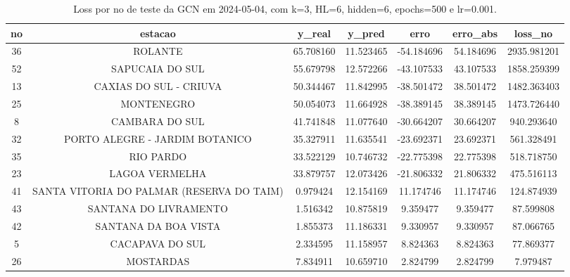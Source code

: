 \begin{table}[h]
\centering
\caption{Loss por no de teste da GCN em 2024-05-04, com k=3, HL=6, hidden=6, epochs=500 e lr=0.001.}
\label{tab:gcn_loss_k3_hl6_h6_e500_d20240504}
\begin{tabular}{ccccccc}
\toprule
no & estacao & y\_real & y\_pred & erro & erro\_abs & loss\_no \\
\midrule
36 & ROLANTE & 65.708160 & 11.523465 & -54.184696 & 54.184696 & 2935.981201 \\
52 & SAPUCAIA DO SUL & 55.679798 & 12.572266 & -43.107533 & 43.107533 & 1858.259399 \\
13 & CAXIAS DO SUL - CRIUVA & 50.344467 & 11.842995 & -38.501472 & 38.501472 & 1482.363403 \\
25 & MONTENEGRO & 50.054073 & 11.664928 & -38.389145 & 38.389145 & 1473.726440 \\
8 & CAMBARA DO SUL & 41.741848 & 11.077640 & -30.664207 & 30.664207 & 940.293640 \\
32 & PORTO ALEGRE - JARDIM BOTANICO & 35.327911 & 11.635541 & -23.692371 & 23.692371 & 561.328491 \\
35 & RIO PARDO & 33.522129 & 10.746732 & -22.775398 & 22.775398 & 518.718750 \\
23 & LAGOA VERMELHA & 33.879757 & 12.073426 & -21.806332 & 21.806332 & 475.516113 \\
41 & SANTA VITORIA DO PALMAR (RESERVA DO TAIM) & 0.979424 & 12.154169 & 11.174746 & 11.174746 & 124.874939 \\
43 & SANTANA DO LIVRAMENTO & 1.516342 & 10.875819 & 9.359477 & 9.359477 & 87.599808 \\
42 & SANTANA DA BOA VISTA & 1.855373 & 11.186331 & 9.330957 & 9.330957 & 87.066765 \\
5 & CACAPAVA DO SUL & 2.334595 & 11.158957 & 8.824363 & 8.824363 & 77.869377 \\
26 & MOSTARDAS & 7.834911 & 10.659710 & 2.824799 & 2.824799 & 7.979487 \\
\bottomrule
\end{tabular}
\end{table}
